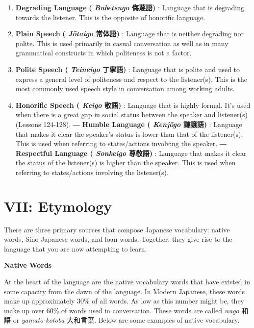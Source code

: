 \begin{enumerate}

\item \textbf{Degrading Language } \textbf{( \emph{Bubetsugo }侮蔑語) }: Language that is degrading towards the listener. This is the opposite of honorific language. 
\item \textbf{Plain Speech } \textbf{( \emph{Jōtaigo }常体語) }: Language that is neither degrading nor polite. This is used primarily in casual conversation as well as in many grammatical constructs in which politeness is not a factor. 
\item \textbf{Polite Speech ( \emph{Teineigo }丁寧語) }: Language that is polite and used to express a general level of politeness and respect to the listener(s). This is the most commonly used speech style in conversation among working adults. 
\item \textbf{Honorific Speech ( \emph{Keigo }敬語) }: Language that is highly formal. It's used when there is a great gap in social status between the speaker and listener(s) (Lessons 124-128). \hfill\break
― \textbf{Humble Language ( \emph{Kenjōgo }謙譲語) }: Language that makes it clear the speaker's status is lower than that of the listener(s). This is used when referring to states\slash actions involving the speaker. \hfill\break
― \textbf{Respectful Language ( \emph{Sonkeigo }尊敬語) }: Language that makes it clear the status of the listener(s) is higher than the speaker. This is used when referring to states\slash actions involving the listener(s). 
\end{enumerate}
      
\section{VII: Etymology}
 
\par{ There are three primary sources that compose Japanese vocabulary: native words, Sino-Japanese words, and loan-words. Together, they give rise to the language that you are now attempting to learn. }

\begin{center}
\textbf{Native Words } \hfill\break

\end{center}

\par{ At the heart of the language are the native vocabulary words that have existed in some capacity from the dawn of the language. In Modern Japanese, these words make up approximately 30\% of all words. As low as this number might be, they make up over 60\% of words used in conversation. These words are called \emph{wago }和語 or \emph{yamato-kotoba }大和言葉. Below are some examples of native vocabulary. }

